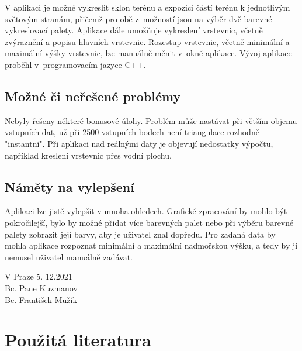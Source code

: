 \documentclass[a4paper, 12pt, oneside, titlepage]{article} %
\begin{document}
V aplikaci je možné vykreslit sklon terénu a expozici částí terénu k jednotlivým světovým stranám, přičemž pro obě z~možností jsou na výběr dvě barevné vykreslovací palety. Aplikace dále umožňuje vykreslení vrstevnic, včetně zvýraznění a popisu hlavních vrstevnic. Rozestup vrstevnic, včetně minimální a maximální výšky vrstevnic, lze manuálně měnit v~okně aplikace. Vývoj aplikace proběhl v~programovacím jazyce C++. 

\subsection{Možné či neřešené problémy} \label{mcn_problemy}
Nebyly řešeny některé bonusové úlohy. Problém může nastávat při větším objemu vstupních dat, už při 2500 vstupních bodech není triangulace rozhodně "instantní". 
Při aplikaci nad reálnými daty je objevují nedostatky výpočtu, například kreslení vrstevnic přes vodní plochu.

\subsection{Náměty na vylepšení} \label{vylepseni}
Aplikaci lze jistě vylepšit v mnoha ohledech. Grafické zpracování by mohlo být pokročilejší, bylo by možné přidat více barevných palet nebo při výběru barevné palety zobrazit její barvy, aby je uživatel znal dopředu. 
Pro zadaná data by mohla aplikace rozpoznat minimální a maximální nadmořskou výšku, a tedy by jí nemusel uživatel manuálně zadávat.




\begin{flushright}
V Praze 5. 12.2021\\
\vspace{2mm}
Bc. Pane Kuzmanov\\
Bc. František Mužík\\
\end{flushright}


\clearpage 
\section*{Použitá literatura}
\renewcommand{\section}[2]{}%


\end{document}
